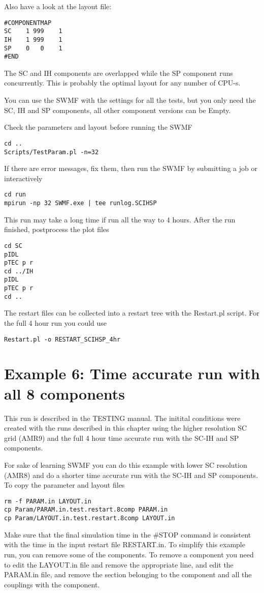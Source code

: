 Also have a look at the layout file:
\begin{verbatim}
#COMPONENTMAP
SC    1 999    1
IH    1 999    1
SP    0   0    1 
#END
\end{verbatim}
The SC and IH components are overlapped while the SP component
runs concurrently. This is probably the optimal layout for any
number of CPU-s.

You can use the SWMF with the settings for all the tests, 
but you only need the SC, IH and SP components,
all other component versions can be Empty.

Check the parameters and layout before running the SWMF
\begin{verbatim}
cd ..
Scripts/TestParam.pl -n=32
\end{verbatim}
If there are error messages, fix them, then run the SWMF by submitting a job
or interactively
\begin{verbatim}
cd run
mpirun -np 32 SWMF.exe | tee runlog.SCIHSP
\end{verbatim}
This run may take a long time if run all the way to 4 hours.
After the run finished, postprocess the plot files
\begin{verbatim}
cd SC
pIDL
pTEC p r
cd ../IH
pIDL
pTEC p r
cd ..
\end{verbatim}
The restart files can be collected into a restart tree 
with the Restart.pl script. For the full 4 hour run you could use
\begin{verbatim}
Restart.pl -o RESTART_SCIHSP_4hr
\end{verbatim}

\section{Example 6: Time accurate run with all 8 components}

This run is described in the TESTING manual. 
The initital conditions were created with the runs described in
this chapter using the higher resolution SC grid (AMR9) and the full 4 hour
time accurate run with the SC-IH and SP components.

For sake of learning SWMF you can do this example with lower SC resolution
(AMR8) and do a shorter time accurate run with the SC-IH and SP components.
To copy the parameter and layout files
\begin{verbatim}
rm -f PARAM.in LAYOUT.in
cp Param/PARAM.in.test.restart.8comp PARAM.in
cp Param/LAYOUT.in.test.restart.8comp LAYOUT.in
\end{verbatim}
Make sure that the final simulation time in the \#STOP command 
is consistent with the time in the input restart file RESTART.in.
To simplify this example run, 
you can remove some of the components.
To remove a component you need to edit the LAYOUT.in file and remove the
appropriate line, and edit the PARAM.in file, and remove the 
section belonging to the component and all the couplings with the 
component. 

